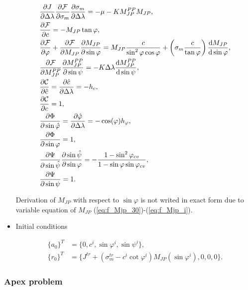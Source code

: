 \begin{itemize}
	\begin{align}
		&\pdv{J}{\Delta \lambda} \pdv{\mathcal{F}}{\sigma_m} \pdv{\sigma_m}{\Delta \lambda}  = -\mu - K M_{JP}^{PP}M_{JP},\\
		&\pdv{\mathcal{F}}{c} = -M_{JP}\tan\varphi,\\
		&\pdv{\mathcal{F}}{\varphi} + \pdv{\mathcal{F}}{M_{JP}} \pdv{M_{JP}}{\sin \varphi} = M_{JP} \dfrac{c}{\sin^2\varphi \cos\varphi} + \left( \sigma_m \dfrac{c}{\tan \varphi} \right) \dv{M_{JP}}{\sin \varphi}, \\
		&\pdv{\mathcal{F}}{M_{JP}^{PP}} \pdv{M_{JP}^{PP}}{\sin \psi} = -K \Delta \lambda \dv{M_{JP}^{PP}}{\sin \psi},\\
		&\pdv{\mathcal{C}}{\hat{c}} = \pdv{\hat{c}}{\Delta \lambda} = -h_c, \\
		&\pdv{\mathcal{C}}{c} = 1,\\
		&\pdv{\mathrm{\Phi}}{\sin \hat{\varphi}} = \pdv{\hat{\varphi}}{\Delta \lambda} = -\cos(\varphi) h_{\varphi},\\
		&\pdv{\mathrm{\Phi}}{\sin \varphi} = 1,\\
		&\pdv{\mathrm{\Psi}}{\sin \hat{\psi}} \pdv{\sin \hat{\psi}}{\sin \varphi} = -\dfrac{1 - \sin^2\varphi_{cv} }{1-\sin \varphi \sin \varphi_{cv}},\\
		&\pdv{\mathrm{\Psi}}{\sin \psi} = 1.
	\end{align}
	
	Derivation of $M_{JP}$ with respect to $\sin \varphi$ is not writed in exact form due to variable equation of $M_{JP}$ (\ref{eq:f_Mjp_30})-(\ref{eq:f_Mjp_i}).
	
	\item Initial conditions
	
	\begin{align}
		\lbrace a_0 \rbrace^T &= \lbrace 0, c^i, \sin \varphi^i, \sin \psi^i \rbrace,\\
		\lbrace r_0 \rbrace^T &= \lbrace J^{tr} + (\sigma_m^{tr}-c^i\cot\varphi^i)M_{JP}(\sin\varphi^i), 0, 0, 0 \rbrace.
	\end{align}
	
\end{itemize} 

\subsubsection{Apex problem}
\indent

